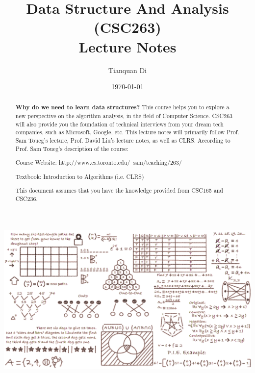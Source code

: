 \documentclass{article}
\begin{document}

\title{\textbf{Data Structure And Analysis} \\(CSC263)\\Lecture Notes}
\author{Tianquan Di}
\date{\today}
\maketitle
\includegraphics{image003.png}

\newpage
\begin{abstract}
    \textbf{Why do we need to learn data structures? }This course helps you to explore a new perspective on the algorithm analysis, in the field of Computer Science. CSC263 will also provide you the foundation of technical interviews from your dream tech companies, such as Microsoft, Google, etc. This lecture notes will primarily follow Prof. Sam Toueg's lecture, Prof. David Liu's lecture notes, as well as CLRS. According to Prof. Sam Toueg's description of the course: 

\begin{center}Course Website: http://www.cs.toronto.edu/~sam/teaching/263/

Textbook: Introduction to Algorithms (i.e. CLRS)

This document assumes that you have the knowledge provided from CSC165 and CSC236.
\end{center}


\end{abstract}
\end{document}
